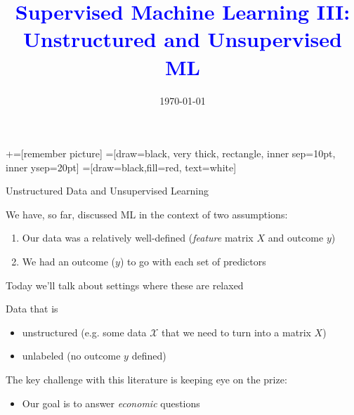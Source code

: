 \documentclass[notes,11pt, aspectratio=169]{beamer}
\title[]{\textcolor{blue}{Supervised Machine Learning III: \\ Unstructured and Unsupervised ML}} \author[PGP]{}
\institute[FRBNY]{\small{\begin{tabular}{c}
                           Paul Goldsmith-Pinkham  \\
\end{tabular}}}
\date{\today}
\newenvironment{wideitemize}{\itemize\addtolength{\itemsep}{10pt}}{\enditemize}
\begin{document}
\newcommand\marktopleft[1]{%
    \tikz[overlay,remember picture] 
        \node (marker-#1-a) at (-.3em,.3em) {};%
}
\newcommand\markbottomright[2]{%
    \tikz[overlay,remember picture] 
        \node (marker-#1-b) at (0em,0em) {};%
}
+=[remember picture] 
 =[draw=black, very thick, rectangle, inner sep=10pt, inner ysep=20pt]
 =[draw=black,fill=red, text=white]

\begin{frame}
\maketitle
\end{frame}

\begin{frame}{Unstructured Data and Unsupervised Learning}
  \begin{wideitemize}
  \item We have, so far, discussed ML in the context of two assumptions:
    \begin{enumerate}
    \item Our data was a relatively well-defined (\emph{feature} matrix $X$ and outcome $y$)
    \item We had an outcome ($y$) to go with each set of predictors
    \end{enumerate}
  \item Today we'll talk about settings where these are relaxed
  \item Data that is 
    \begin{itemize}
    \item unstructured (e.g. some data $\mathcal{X}$ that we need to turn into a matrix $X$)
    \item unlabeled (no outcome $y$ defined)
    \end{itemize}
  \item The key challenge with this literature is keeping eye on the prize:
    \begin{itemize}
    \item Our goal is to answer \emph{economic} questions
    \end{itemize}
  \end{wideitemize}
\end{frame}
\end{document}
